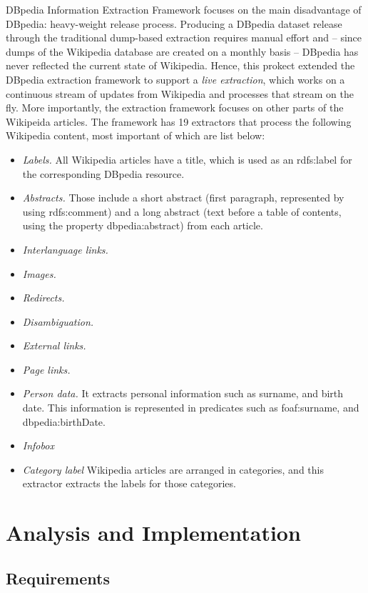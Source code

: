 \documentclass[thesis=M,english,hidelinks]{FITthesis}[2019/12/23]
\begin{document}
DBpedia Information Extraction Framework focuses on the main disadvantage of DBpedia: heavy-weight release process. Producing a DBpedia dataset release through the traditional dump-based extraction requires manual effort and – since dumps of the Wikipedia database are created on a monthly basis – DBpedia has never reflected the current state of Wikipedia. Hence, this prokect extended the DBpedia extraction framework to support a \textit{live extraction}, which works on a continuous stream of updates from Wikipedia and processes that stream on the fly. More importantly, the extraction framework focuses on other parts of the Wikipeida articles. The framework has 19 extractors that process the following Wikipedia content, most important of which are list below:
\begin{itemize}
	\item \textit{Labels.} All Wikipedia articles have a title, which is used as an rdfs:label for the
	corresponding DBpedia resource.
	\item \textit{Abstracts.} Those include a short abstract (first paragraph, represented by using rdfs:comment) and a long abstract (text before a table of contents, using the 	property dbpedia:abstract) from each article.
	\item \textit{Interlanguage links. }
	\item \textit{Images.}
	\item \textit{Redirects.}
	\item \textit{Disambiguation.}
	\item \textit{External links.}
	\item \textit{Page links.}
	\item \textit{Person data.} It extracts personal information such as surname, and birth date.	This information is represented in predicates such as foaf:surname, and dbpedia:birthDate.
	\item \textit{Infobox}
	\item \textit{Category label} Wikipedia articles are arranged in categories, and this extractor	extracts the labels for those categories.
\end{itemize}


\chapter{Analysis and Implementation}

\section{Requirements}\label{framework_requirements}
\end{document}
